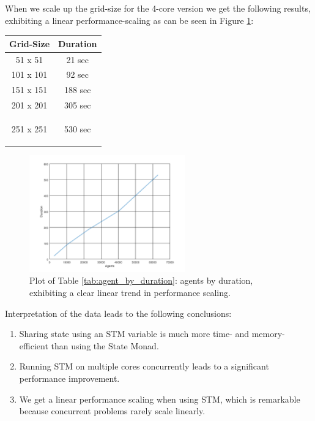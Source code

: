 When we scale up the grid-size for the 4-core version we get the following results, exhibiting a linear performance-scaling as can be seen in Figure \ref{fig:agent_by_duration}:
\begin{center}
  \begin{tabular}{ c || c }
    Grid-Size & Duration \\ \hline \hline 
    51 x 51 & 21 sec \\ \hline
    101 x 101 & 92 sec \\ \hline
    151 x 151 & 188 sec \\ \hline
    201 x 201 & 305 sec \\ \hline
    251 x 251 & 530 sec 
    
    \label{tab:agent_by_duration}
  \end{tabular}
\end{center}

\begin{figure}
	\centering
	\includegraphics[width=0.6\textwidth, angle=0]{./fig/agents_duration_stm.png}
	\caption{Plot of Table \ref{tab:agent_by_duration}: agents by duration, exhibiting a clear linear trend in performance scaling.}
	\label{fig:agent_by_duration}
\end{figure}


Interpretation of the data leads to the following conclusions:
\begin{enumerate}
	\item Sharing state using an STM variable is much more time- and memory-efficient than using the State Monad.
	\item Running STM on multiple cores concurrently leads to a significant performance improvement.
	\item We get a linear performance scaling when using STM, which is remarkable because concurrent problems rarely scale linearly.
\end{enumerate}


